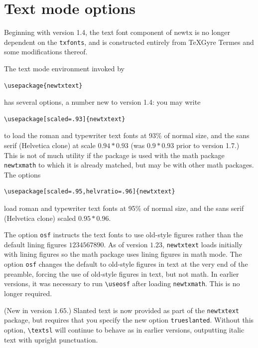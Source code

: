 \documentclass[\fsc]{article}
\theoremstyle{oldplain}
\theoremstyle{plain}
\begin{document}
\section{Text mode options}
Beginning with version 1.4, the text font component of \textsf{newtx} is no longer dependent on the {\tt txfonts}, and is constructed entirely from \textsf{TeXGyre Termes} and some modifications thereof.

The text mode environment invoked by
\begin{verbatim}
\usepackage{newtxtext}
\end{verbatim}
has several options, a number new to version 1.4: you may write
\begin{verbatim}
\usepackage[scaled=.93]{newtxtext}
\end{verbatim}
to load the roman and typewriter text fonts at 93\% of normal size, and the sans serif (\textsf{Helvetica} clone) at scale $0.94*0.93$ (was $0.9*0.93$ prior to version 1.7.) This is not of much utility if the package is used with the math package {\tt newtxmath} to which it is already matched, but may be with other math packages. The options
\begin{verbatim}
\usepackage[scaled=.95,helvratio=.96]{newtxtext}
\end{verbatim}
load roman and typewriter text fonts at 95\% of normal size, and the sans serif (\textsf{Helvetica} clone)  scaled $0.95*0.96$.

The option \texttt{osf} instructs the text fonts to use old-style figures  rather than the default lining figures $1234567890$. As of version $1.23$, {\tt newtxtext} loads initially with lining figures so the math package uses lining figures in math mode. The option {\tt osf} changes the default to old-style figures in text at the very end of the preamble, forcing the use of old-style figures in text, but not math. In earlier versions, it was necessary to run 
\verb|\useosf| after loading {\tt newtxmath}. This is no longer required. 

(New in version $1.65$.) Slanted text is now provided as part of the {\tt newtxtext} package, but requires that you specify the new option {\tt trueslanted}. Without this option, \verb|\textsl| will continue to behave as in earlier versions, outputting italic text with upright punctuation.
\end{document}
